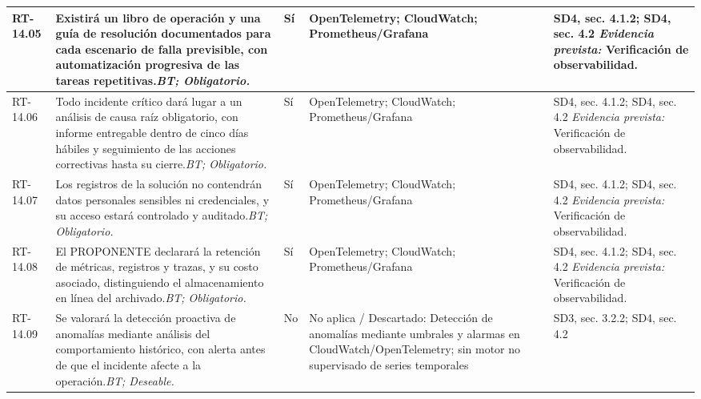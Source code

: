 \begin{paginaHorizontalSynaptix}
\begin{longtable}{|L{0.09\AnchoMatrizTDoce}|L{0.385\AnchoMatrizTDoce}|L{0.065\AnchoMatrizTDoce}|L{0.18\AnchoMatrizTDoce}|L{0.28\AnchoMatrizTDoce}|}
RT-\allowbreak{}14.\allowbreak{}05 &
Existirá un libro de operación y una guía de resolución documentados para cada escenario de falla previsible, con automatización progresiva de las tareas repetitivas.\newline\textit{BT; Obligatorio.} &
Sí &
OpenTelemetry; CloudWatch; Prometheus/Grafana &
SD4, sec. 4.1.2; SD4, sec. 4.2 \newline\textit{Evidencia prevista:} Verificación de observabilidad. \\ \hline

RT-\allowbreak{}14.\allowbreak{}06 &
Todo incidente crítico dará lugar a un análisis de causa raíz obligatorio, con informe entregable dentro de cinco días hábiles y seguimiento de las acciones correctivas hasta su cierre.\newline\textit{BT; Obligatorio.} &
Sí &
OpenTelemetry; CloudWatch; Prometheus/Grafana &
SD4, sec. 4.1.2; SD4, sec. 4.2 \newline\textit{Evidencia prevista:} Verificación de observabilidad. \\ \hline

RT-\allowbreak{}14.\allowbreak{}07 &
Los registros de la solución no contendrán datos personales sensibles ni credenciales, y su acceso estará controlado y auditado.\newline\textit{BT; Obligatorio.} &
Sí &
OpenTelemetry; CloudWatch; Prometheus/Grafana &
SD4, sec. 4.1.2; SD4, sec. 4.2 \newline\textit{Evidencia prevista:} Verificación de observabilidad. \\ \hline

RT-\allowbreak{}14.\allowbreak{}08 &
El PROPONENTE declarará la retención de métricas, registros y trazas, y su costo asociado, distinguiendo el almacenamiento en línea del archivado.\newline\textit{BT; Obligatorio.} &
Sí &
OpenTelemetry; CloudWatch; Prometheus/Grafana &
SD4, sec. 4.1.2; SD4, sec. 4.2 \newline\textit{Evidencia prevista:} Verificación de observabilidad. \\ \hline

RT-\allowbreak{}14.\allowbreak{}09 &
Se valorará la detección proactiva de anomalías mediante análisis del comportamiento histórico, con alerta antes de que el incidente afecte a la operación.\newline\textit{BT; Deseable.} &
No &
No aplica / Descartado: Detección de anomalías mediante umbrales y alarmas en CloudWatch/OpenTelemetry; sin motor no supervisado de series temporales &
SD3, sec. 3.2.2; SD4, sec. 4.2 \\ \hline


\end{longtable}
\end{paginaHorizontalSynaptix}
